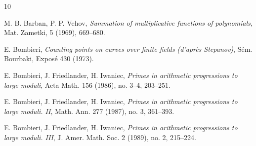 \documentclass[12pt,a4paper,reqno]{amsart}
\numberwithin{equation}{section}
\theoremstyle{plain}
\theoremstyle{definition}
\begin{document}
\begin{thebibliography}{10}




M. B. Barban, P. P. Vehov, \emph{Summation of multiplicative functions
of polynomials}, Mat. Zametki, 5 (1969), 669--680.

 E. Bombieri, \emph{Counting points on
    curves over finite fields (d'apr\`es Stepanov)}, S\'em. Bourbaki,
  Expos\'e 430 (1973).




 E. Bombieri, J. Friedlander, H. Iwaniec, \emph{Primes in
    arithmetic progressions to large moduli}, Acta Math. 156
  (1986), no. 3--4, 203--251.

 E. Bombieri, J. Friedlander, H. Iwaniec, \emph{Primes
    in arithmetic progressions to large moduli. II},
  Math. Ann. 277 (1987), no. 3, 361--393.

E. Bombieri, J. Friedlander, H. Iwaniec, \emph{Primes in arithmetic progressions to large moduli. III}, J. Amer. Math. Soc. 2 (1989), no. 2, 215--224. 




\end{thebibliography}
\end{document}
